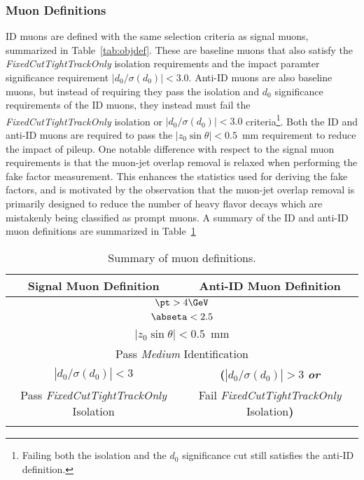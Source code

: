   \FloatBarrier
\subsubsection{Muon Definitions}

ID muons are defined with the same selection criteria as signal muons, summarized in Table~\ref{tab:objdef}. These are baseline muons that also satisfy the \textit{FixedCutTightTrackOnly} isolation requirements and the impact paramter significance requirement $|d_0/\sigma(d_0)|<3.0$.  Anti-ID muons are also baseline muons, but instead of requiring they pass the isolation and $d_0$ significance requirements of the ID muons, they instead must fail the \textit{FixedCutTightTrackOnly} isolation or $|d_0/\sigma(d_0)|<3.0$ criteria\footnote{Failing both the isolation and the $d_0$ significance cut still satisfies the anti-ID definition.}. Both the ID and anti-ID muons are required to pass the $|z_0\sin\theta| < 0.5$~mm requirement to reduce the impact of pileup.  One notable difference with respect to the signal muon requirements is that the muon-jet overlap removal is relaxed when performing the fake factor measurement.  This enhances the statistics used for deriving the fake factors, and is motivated by the observation that the muon-jet overlap removal is primarily designed to reduce the number of heavy flavor decays which are mistakenly being classified as prompt muons.  A summary of the ID and anti-ID muon definitions are summarized in Table~\ref{tab:AllMuDefs}
\begin{table}[!htb]
\begin{center}
\begin{tabular}{c|c}
\hline
Signal Muon Definition  & Anti-ID Muon Definition \\
\hline \hline
\multicolumn{2}{c}{$\pt > 4\GeV$}      \\
\multicolumn{2}{c}{$\abseta < 2.5$ }     \\
\multicolumn{2}{c}{$|z_0\sin\theta| < 0.5$~mm} \\
\multicolumn{2}{c}{Pass \textit{Medium} Identification}     \\
$|d_0/\sigma(d_0)| < 3$  &   \textbf{(}$|d_0/\sigma(d_0)| > 3$ \textbf{\textit{or}}\\
Pass \textit{FixedCutTightTrackOnly} Isolation  & Fail \textit{FixedCutTightTrackOnly} Isolation\textbf{)} \\   \\
\hline
\end{tabular}
\caption{Summary of muon definitions.}
\label{tab:AllMuDefs}
\end{center}
\end{table}

